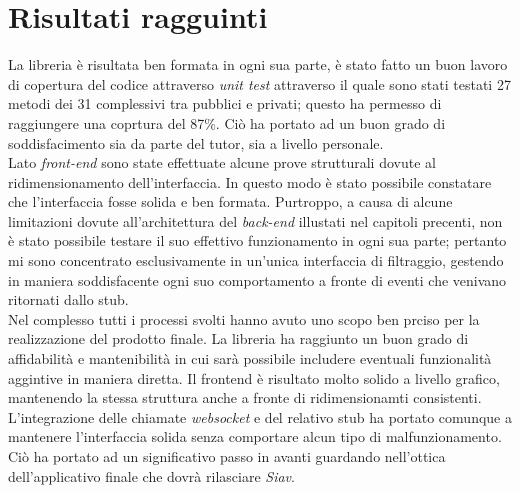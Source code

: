 \section{Risultati ragguinti}
La libreria è risultata ben formata in ogni sua parte, è stato fatto un buon lavoro di copertura del codice attraverso \textit{\gls{unit test}} attraverso il quale sono stati testati 27 metodi dei 31 complessivi tra pubblici e privati; questo ha permesso di raggiungere una coprtura del 87\%. Ciò ha portato ad un buon grado di soddisfacimento sia da parte del tutor, sia a livello personale.\\
Lato \textit{front-end} sono state effettuate alcune prove strutturali dovute al ridimensionamento dell'interfaccia. In questo modo è stato possibile constatare che l'interfaccia fosse solida e ben formata. Purtroppo, a causa di alcune limitazioni dovute all'architettura del \textit{back-end} illustati nel capitoli precenti, non è stato possibile testare il suo effettivo funzionamento in ogni sua parte; pertanto mi sono concentrato esclusivamente in un'unica interfaccia di filtraggio, gestendo in maniera soddisfacente ogni suo comportamento a fronte di eventi che venivano ritornati dallo stub.\\
Nel complesso tutti i processi svolti hanno avuto uno scopo ben prciso per la realizzazione del prodotto finale. La libreria ha raggiunto un buon grado di affidabilità e mantenibilità in cui sarà possibile includere eventuali funzionalità aggintive in maniera diretta. Il frontend è risultato molto solido a livello grafico, mantenendo la stessa struttura anche a fronte di ridimensionamti consistenti. L'integrazione delle chiamate \textit{websocket} e del relativo stub ha portato comunque a mantenere l'interfaccia solida senza comportare alcun tipo di malfunzionamento. Ciò ha portato ad un significativo passo in avanti guardando nell'ottica dell'applicativo finale che dovrà rilasciare \textit{Siav}.